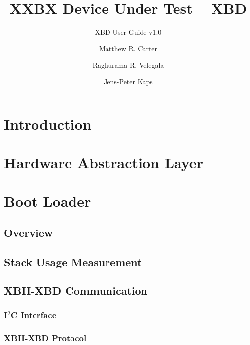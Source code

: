 \documentclass[twoside,11pt]{cergdoc}
\begin{document}
\title{XXBX Device Under Test -- XBD}
\subtitle{XBD User Guide v1.0}
\author{Matthew R. Carter \and Raghurama R. Velegala \and Jens-Peter Kaps}

\maketitle

\tableofcontents

\chapter{Introduction}
\chapter{Hardware Abstraction Layer}
\chapter{Boot Loader}
  \section{Overview}
  \section{Stack Usage Measurement}
  \section{XBH-XBD Communication}
    \subsection{I$^2$C Interface}
    \subsection{XBH-XBD Protocol}
\end{document}
